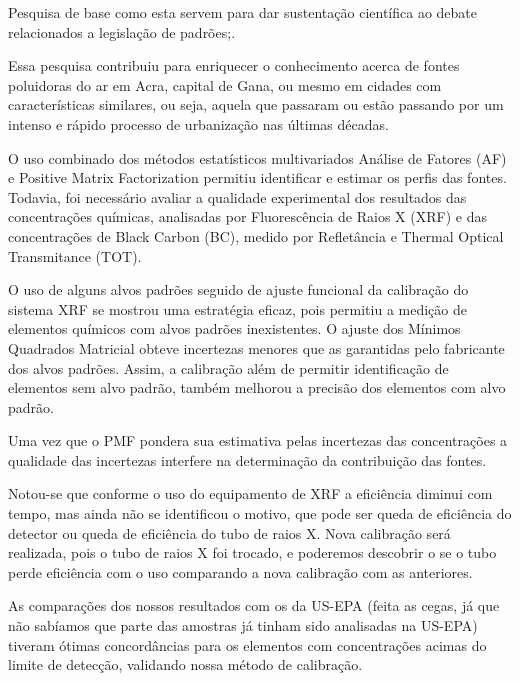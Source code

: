 
Pesquisa de base como esta servem para dar sustentação científica 
ao debate relacionados a legislação de padrões;.

Essa pesquisa contribuiu para enriquecer o conhecimento acerca de fontes poluidoras do ar em Acra, capital de Gana, ou mesmo em cidades com características similares, ou seja, aquela que passaram ou estão passando por um intenso e rápido processo de urbanização nas últimas décadas.  

O uso combinado dos  métodos estatísticos multivariados Análise de Fatores (AF) e Positive Matrix Factorization permitiu identificar e estimar os perfis das fontes. Todavia, foi necessário avaliar
a qualidade experimental dos resultados das concentrações químicas, analisadas por Fluorescência de Raios X (XRF) e das concentrações de Black Carbon (BC), medido por Refletância e Thermal Optical Transmitance (TOT). 

O uso de alguns alvos padrões seguido de ajuste funcional da calibração do sistema XRF se mostrou uma estratégia eficaz, pois permitiu a medição de elementos químicos com alvos padrões inexistentes. O ajuste dos Mínimos Quadrados Matricial obteve incertezas menores que as garantidas pelo fabricante dos alvos padrões. Assim, a calibração além de permitir identificação de elementos sem alvo padrão, também melhorou a precisão dos elementos com alvo padrão. 

Uma vez que o PMF pondera sua estimativa pelas incertezas das concentrações a qualidade das incertezas interfere na determinação da contribuição das fontes.

Notou-se que conforme o uso do equipamento de XRF a eficiência diminui com tempo, mas ainda não se identificou o motivo, que pode ser queda de eficiência do detector ou queda de eficiência do tubo de raios X. Nova calibração será realizada, pois o tubo de raios X foi trocado, e poderemos descobrir o se o tubo perde eficiência com o uso comparando a nova calibração com as anteriores. 

As comparações dos nossos resultados com os da US-EPA (feita as cegas, já que não sabíamos que parte das amostras já tinham sido analisadas na US-EPA) tiveram ótimas concordâncias para os elementos com concentrações acimas do limite de detecção, validando nossa método de calibração.   

